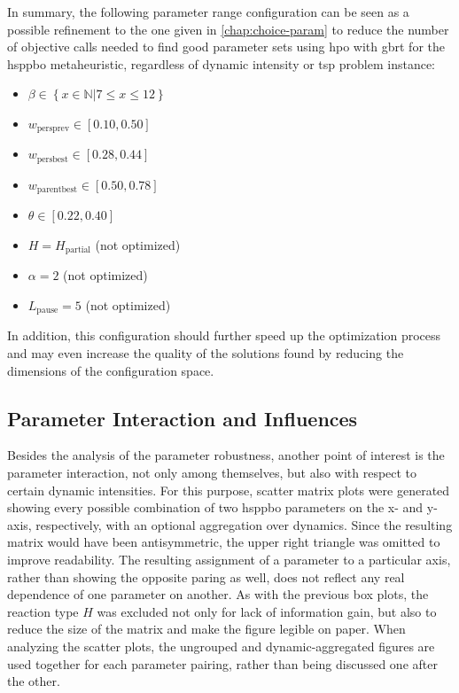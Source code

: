 In summary, the following parameter range configuration can be seen as a possible refinement to the one given in \cref{chap:choice-param} to reduce the number of objective calls needed to find good parameter sets using \gls{hpo} with \gls{gbrt} for the \gls{hsppbo} metaheuristic, regardless of dynamic intensity or \gls{tsp} problem instance:
\begin{itemize}
	\item $\beta \in \left\lbrace x\in\mathbb{N} | 7 \leq x \leq 12 \right\rbrace$
	\item $w_{\text{persprev}} \in [0.10,0.50]$
	\item $w_{\text{persbest}} \in [0.28,0.44]$
	\item $w_{\text{parentbest}} \in [0.50,0.78]$
	\item $\theta \in [0.22,0.40]$
	\item $H = H_{\text{partial}}$ (not optimized)
	\item $\alpha = 2$ (not optimized) 
	\item $L_\text{pause} = 5$ (not optimized)
\end{itemize}
 In addition, this configuration should further speed up the optimization process and may even increase the quality of the solutions found by reducing the dimensions of the configuration space.

\subsection{Parameter Interaction and Influences}

Besides the analysis of the parameter robustness, another point of interest is the parameter interaction, not only among themselves, but also with respect to certain dynamic intensities.
For this purpose, scatter matrix plots were generated showing every possible combination of two \gls{hsppbo} parameters on the x- and y-axis, respectively, with an optional aggregation over dynamics. Since the resulting matrix would have been antisymmetric, the upper right triangle was omitted to improve readability. The resulting assignment of a parameter to a particular axis, rather than showing the opposite paring as well, does not reflect any real dependence of one parameter on another. As with the previous box plots, the reaction type $H$ was excluded not only for lack of information gain, but also to reduce the size of the matrix and make the figure legible on paper. When analyzing the scatter plots, the ungrouped and dynamic-aggregated figures are used together for each parameter pairing, rather than being discussed one after the other.


